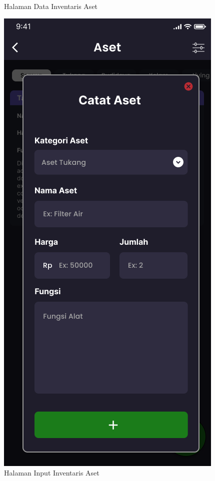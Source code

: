 \begin{spacing}{1.5}
\begin{figure}[H]
			\caption{Halaman Data Inventaris Aset}
		\endminipage\hfill
			\includegraphics[width=\linewidth]{gambar/sprint1/mockup_input_aset.png}
			\caption{Halaman Input Inventaris Aset}
		\endminipage
		\hspace{.05\linewidth}
	\end{figure}


\end{spacing}
